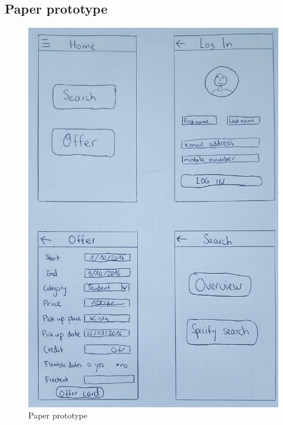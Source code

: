 \documentclass[11pt,twoside,a4paper]{report}
\begin{document}
\begin{appendices}

\chapter{Paper prototype}
\label{chapter:paper-prototype}

\begin{figure}
	\centering
	\includegraphics[width=\textwidth]{Paper_prototype1.jpg}
	\caption{Paper prototype}
	\label{paper prototype 1}
\end{figure}


\end{appendices}
\end{document}
